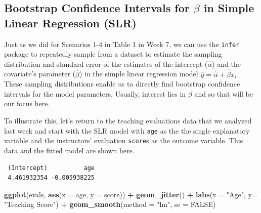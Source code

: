 \documentclass[]{article}
\newenvironment{Shaded}{\begin{snugshade}}{\end{snugshade}}
\newcommand{\KeywordTok}[1]{\textcolor[rgb]{0.13,0.29,0.53}{\textbf{#1}}}
\newcommand{\DataTypeTok}[1]{\textcolor[rgb]{0.13,0.29,0.53}{#1}}
\newcommand{\StringTok}[1]{\textcolor[rgb]{0.31,0.60,0.02}{#1}}
\newcommand{\OtherTok}[1]{\textcolor[rgb]{0.56,0.35,0.01}{#1}}
\newcommand{\OperatorTok}[1]{\textcolor[rgb]{0.81,0.36,0.00}{\textbf{#1}}}
\newcommand{\NormalTok}[1]{#1}
\begin{document}
\subsection{\texorpdfstring{Bootstrap Confidence Intervals for \(\beta\)
in Simple Linear Regression
(SLR)}{Bootstrap Confidence Intervals for \textbackslash{}beta in Simple Linear Regression (SLR)}}\label{bootstrap-confidence-intervals-for-beta-in-simple-linear-regression-slr}

Just as we did for Scenarios 1-4 in Table 1 in Week 7, we can use the
\texttt{infer} package to repeatedly sample from a dataset to estimate
the sampling distribution and standard error of the estimates of the
intercept (\(\hat{\alpha}\)) and the covariate's parameter
(\(\hat{\beta}\)) in the simple linear regression model
\(\hat{y} = \hat{\alpha} + \hat{\beta}x_i\). These sampling
distributions enable us to directly find bootstrap confidence intervals
for the model parameters. Usually, interest lies in \(\beta\) and so
that will be our focus here.

To illustrate this, let's return to the teaching evaluations data that
we analyzed last week and start with the SLR model with \texttt{age} as
the the single explanatory variable and the instructors' evaluation
\texttt{score}s as the outcome variable. This data and the fitted model
are shown here.

\begin{Shaded}
\end{Shaded}

\begin{verbatim}
 (Intercept)          age 
 4.461932354 -0.005938225 
\end{verbatim}

\begin{Shaded}
\begin{Highlighting}[]
\KeywordTok{ggplot}\NormalTok{(evals, }\KeywordTok{aes}\NormalTok{(}\DataTypeTok{x =}\NormalTok{ age, }\DataTypeTok{y =}\NormalTok{ score)) }\OperatorTok{+}\StringTok{ }
\StringTok{  }\KeywordTok{geom_jitter}\NormalTok{() }\OperatorTok{+}
\StringTok{  }\KeywordTok{labs}\NormalTok{(}\DataTypeTok{x =} \StringTok{"Age"}\NormalTok{, }\DataTypeTok{y=} \StringTok{"Teaching Score"}\NormalTok{) }\OperatorTok{+}
\StringTok{  }\KeywordTok{geom_smooth}\NormalTok{(}\DataTypeTok{method =} \StringTok{"lm"}\NormalTok{, }\DataTypeTok{se =} \OtherTok{FALSE}\NormalTok{)}
\end{Highlighting}
\end{Shaded}
\end{document}

